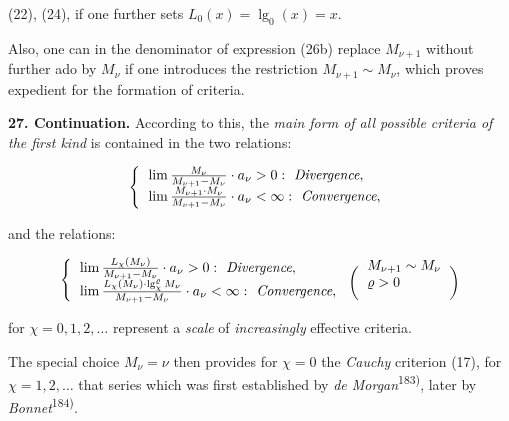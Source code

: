 \thispagestyle{fancy}

\vspace{0.5cm}

(22), (24), if one further sets $L_0(x) = \lg_0(x) = x$.

Also, one can in the denominator of expression (26b) replace $M_{\nu+1}$ without further ado by $M_\nu$ if one introduces the restriction $M_{\nu+1} \sim M_\nu$, which proves expedient for the formation of criteria.

\vspace{0.3cm}
\textbf{27. Continuation.} According to this, the \textit{main form of all possible criteria of the first kind} is contained in the two relations:

\vspace{-0.5cm}
\begin{align}
    \left\{ 
    \begin{tabular}{l}
    $\lim \frac{M_\nu}{M_{\nu+1} - M_\nu} \cdot a_\nu > 0: \textit{ Divergence},$\\ 
    $\lim \frac{M_{\nu+1} \cdot M_\nu}{M_{\nu+1} - M_\nu} \cdot a_\nu < \infty: \textit{ Convergence},$
    \end{tabular}
    \right.
\end{align}
\vspace{-0.2cm}

and the relations:

\vspace{-0.5cm}
\begin{align}
    \left\{ 
    \begin{tabular}{l}
    $\lim \frac{L_\chi(M_\nu)}{M_{\nu+1} - M_\nu} \cdot a_\nu > 0: \textit{ Divergence},$\\ 
    $\lim \frac{L_\chi(M_{\nu}) \cdot \lg_{\chi}^{\varrho} M_\nu}{M_{\nu+1} - M_\nu} \cdot a_\nu < \infty: \textit{ Convergence},$
    \end{tabular}
    \right. \raisebox{-0.5ex}{\bigg(\begin{tabular}[b]{l} $M_{\nu+1} \sim M_\nu$ \\ $\varrho > 0$ \end{tabular}\bigg)}
\end{align}
\vspace{-0.2cm}

for $\chi = 0, 1, 2, \ldots$ represent a \textit{scale} of \textit{increasingly} effective criteria.

The special choice $M_\nu = \nu$ then provides for $\chi = 0$ the \textit{Cauchy} criterion (17), for $\chi = 1, 2, \ldots$ that series which was first established by \textit{de Morgan}\textsuperscript{183)}, later by \textit{Bonnet}\textsuperscript{184)}.

